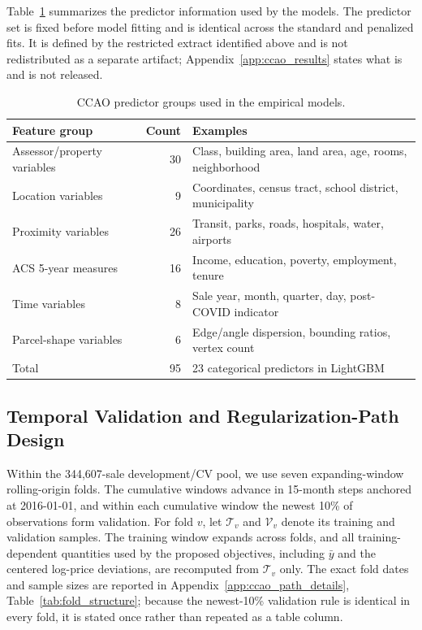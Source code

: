 \documentclass[10pt]{article}
\theoremstyle{definition}
\newcommand{\1}{\mathbf{1}}
\begin{document}
{Table~\ref{tab:feature_groups} summarizes the predictor information used by the models. The predictor set is fixed before model fitting and is identical across the standard and penalized fits. It is defined by the restricted extract identified above and is not redistributed as a separate artifact; Appendix~\ref{app:ccao_results} states what is and is not released.}

{
\begin{table}[!ht]
\centering
\caption{CCAO predictor groups used in the empirical models.}
\label{tab:feature_groups}
\begin{tabular}{lrl}
\toprule
Feature group & Count & Examples \\
\midrule
Assessor/property variables & 30 & Class, building area, land area, age, rooms, neighborhood \\
Location variables & 9 & Coordinates, census tract, school district, municipality \\
Proximity variables & 26 & Transit, parks, roads, hospitals, water, airports \\
ACS 5-year measures & 16 & Income, education, poverty, employment, tenure \\
Time variables & 8 & Sale year, month, quarter, day, post-COVID indicator \\
Parcel-shape variables & 6 & Edge/angle dispersion, bounding ratios, vertex count \\
\midrule
Total & 95 & 23 categorical predictors in LightGBM \\
\bottomrule
\end{tabular}
\end{table}
}


\subsection{Temporal Validation and Regularization-Path Design}
\label{subsec:path_design}

Within the 344,607-sale development/CV pool, we use seven expanding-window
rolling-origin folds. The cumulative windows advance in 15-month steps anchored at
2016-01-01, and within each cumulative window the newest 10\% of observations form
validation. For fold $v$, let $\mathcal T_v$ and $\mathcal V_v$ denote its training
and validation samples. The training window expands across folds, and all
training-dependent quantities used by the proposed objectives, including $\bar y$
and the centered log-price deviations, are recomputed from $\mathcal T_v$ only.
The exact fold dates and sample sizes are reported in Appendix~\ref{app:ccao_path_details}, Table~\ref{tab:fold_structure}; because the newest-10\% validation rule is identical in every fold, it is stated once rather than repeated as a table column.
\end{document}
